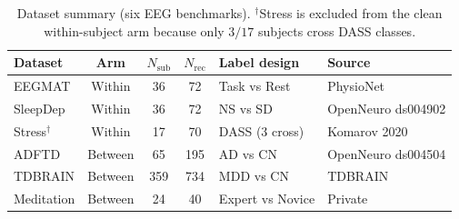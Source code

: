 \begin{table}[t]
\centering
\caption{Dataset summary (six EEG benchmarks). $^{\dagger}$Stress is excluded from the clean within-subject arm because only $3/17$ subjects cross DASS classes.}
\label{tab:datasets}
\begin{tabular}{lcccll}
\toprule
Dataset & Arm & $N_{\mathrm{sub}}$ & $N_{\mathrm{rec}}$ & Label design & Source \\
\midrule
EEGMAT & Within & 36 & 72 & Task vs Rest & PhysioNet \\
SleepDep & Within & 36 & 72 & NS vs SD & OpenNeuro ds004902 \\
Stress$^\dagger$ & Within & 17 & 70 & DASS (3 cross) & Komarov 2020 \\
ADFTD & Between & 65 & 195 & AD vs CN & OpenNeuro ds004504 \\
TDBRAIN & Between & 359 & 734 & MDD vs CN & TDBRAIN \\
Meditation & Between & 24 & 40 & Expert vs Novice & Private \\
\bottomrule
\end{tabular}
\end{table}
